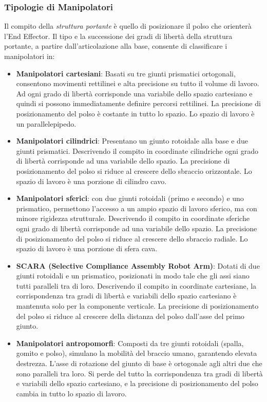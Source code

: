 \documentclass[11pt, a4paper]{report}
\begin{document}
\subsubsection{Tipologie di Manipolatori}
Il compito della \textit{struttura portante} è quello di posizionare il polso che orienterà l'End Effector. Il tipo e la successione dei gradi di libertà della struttura portante, a partire dall'articolazione alla base, consente di classificare i manipolatori in:
\begin{itemize}
	\item \textbf{Manipolatori cartesiani}: Basati su tre giunti prismatici ortogonali, consentono movimenti rettilinei e alta precisione su tutto il volume di lavoro. Ad ogni grado di libertà corrisponde una variabile dello spazio cartesiano e quindi si possono immediatamente definire percorsi rettilinei. La precisione di posizionamento del polso è costante in tutto lo spazio. Lo spazio di lavoro è un parallelepipedo.

	\item \textbf{Manipolatori cilindrici}: Presentano un giunto rotoidale alla base e due giunti prismatici. Descrivendo il compito in coordinate cilindriche ogni grado di libertà corrisponde ad una variabile dello spazio. La precisione di posizionamento del polso si riduce al crescere dello sbraccio orizzontale. Lo spazio di lavoro è una porzione di cilindro cavo.

	\item \textbf{Manipolatori sferici}: con due giunti rotoidali (primo e secondo) e uno prismatico, permettono l'accesso a un ampio spazio di lavoro sferico, ma con minore rigidezza strutturale. Descrivendo il compito in coordinate sferiche ogni grado di libertà corrisponde ad una variabile dello spazio. La precisione di posizionamento del polso si riduce al crescere dello sbraccio radiale. Lo spazio di lavoro è una porzione di sfera cava.


	\item \textbf{SCARA (Selective Compliance Assembly Robot Arm)}: Dotati di due giunti rotoidali e un prismatico, posizionati in modo tale che gli assi siano tutti paralleli tra di loro. Descrivendo il compito in coordinate cartesiane, la corrispondenza tra gradi di libertà e variabili dello spazio cartesiano è mantenuta solo per la componente verticale. La precisione di posizionamento del polso si riduce al crescere della distanza del polso dall'asse del primo giunto.

	\item \textbf{Manipolatori antropomorfi}: Composti da tre giunti rotoidali (spalla, gomito e polso), simulano la mobilità del braccio umano, garantendo elevata destrezza. L'asse di rotazione del giunto di base è ortogonale agli altri due che sono paralleli tra loro. Si perde del tutto la corrispondenza tra gradi di libertà e variabili dello spazio cartesiano, e la precisione di posizionamento del polso cambia in tutto lo spazio di lavoro.


\end{itemize}
\end{document}
